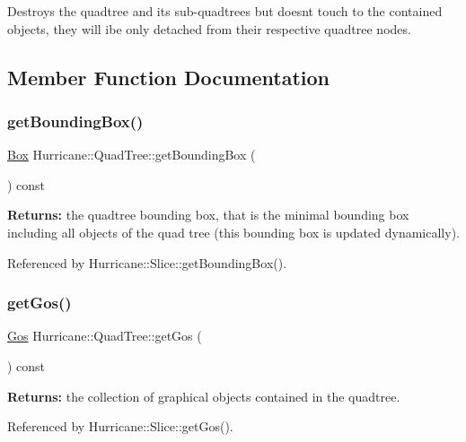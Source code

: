 Destroys the quadtree and its sub-\/quadtrees but doesn\textquotesingle{}t touch to the contained objects, they will ibe only detached from their respective quadtree nodes. 

\subsection{Member Function Documentation}
\mbox{\label{classHurricane_1_1QuadTree_a80806e2d7e99fee07d0335697ed9b82b}} 
\subsubsection{\texorpdfstring{get\+Bounding\+Box()}{getBoundingBox()}}
{\footnotesize\ttfamily \mbox{\hyperlink{classHurricane_1_1Box}{Box}} Hurricane\+::\+Quad\+Tree\+::get\+Bounding\+Box (\begin{DoxyParamCaption}{ }\end{DoxyParamCaption}) const}

{\bfseries Returns\+:} the quadtree bounding box, that is the minimal bounding box including all objects of the quad tree (this bounding box is updated dynamically). 

Referenced by Hurricane\+::\+Slice\+::get\+Bounding\+Box().

\mbox{\label{classHurricane_1_1QuadTree_a571dd774ee953dfebb3d4162f98c679c}} 
\subsubsection{\texorpdfstring{get\+Gos()}{getGos()}}
{\footnotesize\ttfamily \mbox{\hyperlink{namespaceHurricane_a4456a34f3bc6766d471c3064ace19759}{Gos}} Hurricane\+::\+Quad\+Tree\+::get\+Gos (\begin{DoxyParamCaption}{ }\end{DoxyParamCaption}) const}

{\bfseries Returns\+:} the collection of graphical objects contained in the quadtree. 

Referenced by Hurricane\+::\+Slice\+::get\+Gos().

